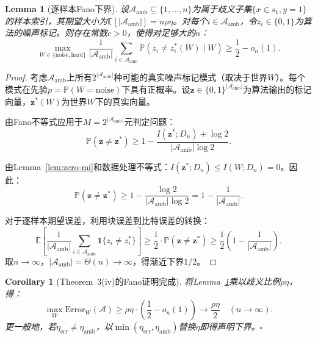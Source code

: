 \documentclass[12pt,a4paper]{ctexart}
\newtheorem{lemma}[theorem]{Lemma}
\newtheorem{corollary}[theorem]{Corollary}
\theoremstyle{definition}
\theoremstyle{remark}
\begin{document}
\begin{lemma}[逐样本Fano下界]
\label{lem:per-sample-fano}
设$\mathcal{A}_{\text{amb}} \subseteq \{1,\ldots,n\}$为属于歧义子集$\{x \in s_1, y=1\}$的样本索引，其期望大小为$\mathbb{E}[|\mathcal{A}_{\text{amb}}|] = n\rho\eta$。对每个$i \in \mathcal{A}_{\text{amb}}$，令$z_i \in \{0,1\}$为算法的噪声标记。则存在常数$c > 0$，使得对足够大的$n$：
\begin{equation}
\max_{W \in \{\text{noise}, \text{hard}\}} \frac{1}{|\mathcal{A}_{\text{amb}}|} \sum_{i \in \mathcal{A}_{\text{amb}}} \mathbb{P}(z_i \neq z_i^*(W) \mid W) \geq \frac{1}{2} - o_n(1).
\end{equation}
\end{lemma}
\begin{proof}
考虑$\mathcal{A}_{\text{amb}}$上所有$2^{|\mathcal{A}_{\text{amb}}|}$种可能的真实噪声标记模式（取决于世界$W$）。每个模式在先验$p=\mathbb{P}(W=\text{noise})$下具有正概率。设$\mathbf{z} \in \{0,1\}^{|\mathcal{A}_{\text{amb}}|}$为算法输出的标记向量，$\mathbf{z}^*(W)$为世界$W$下的真实向量。

由Fano不等式应用于$M = 2^{|\mathcal{A}_{\text{amb}}|}$元判定问题：
\begin{equation}
\mathbb{P}(\mathbf{z} \neq \mathbf{z}^*) \geq 1 - \frac{I(\mathbf{z}^*; D_n) + \log 2}{|\mathcal{A}_{\text{amb}}| \log 2}.
\end{equation}

由Lemma~\ref{lem:zero-mi}和数据处理不等式：$I(\mathbf{z}^*; D_n) \leq I(W; D_n) = 0$。因此：
\begin{equation}
\mathbb{P}(\mathbf{z} \neq \mathbf{z}^*) \geq 1 - \frac{\log 2}{|\mathcal{A}_{\text{amb}}| \log 2} = 1 - \frac{1}{|\mathcal{A}_{\text{amb}}|}.
\end{equation}

对于逐样本期望误差，利用块误差到比特误差的转换：
\begin{equation}
\mathbb{E}\left[\frac{1}{|\mathcal{A}_{\text{amb}}|} \sum_{i \in \mathcal{A}_{\text{amb}}} \mathbf{1}\{z_i \neq z_i^*\}\right] \geq \frac{1}{2} \cdot \mathbb{P}(\mathbf{z} \neq \mathbf{z}^*) \geq \frac{1}{2}\left(1 - \frac{1}{|\mathcal{A}_{\text{amb}}|}\right).
\end{equation}
取$n \to \infty$，$|\mathcal{A}_{\text{amb}}| = \Theta(n) \to \infty$，得渐近下界$1/2$。
\end{proof}

\begin{corollary}[Theorem~3(iv)的Fano证明完成]
将Lemma~\ref{lem:per-sample-fano}乘以歧义比例$\rho\eta$，得：
\begin{equation}
\max_{W} \mathrm{Error}_W(\mathcal{A}) \geq \rho\eta \cdot \left(\frac{1}{2} - o_n(1)\right) \to \frac{\rho\eta}{2} \quad (n \to \infty).
\end{equation}
更一般地，若$\eta_{\text{err}} \neq \eta_{\text{amb}}$，以$\min(\eta_{\text{err}}, \eta_{\text{amb}})$替换$\eta$即得声明下界。\hfill$\square$
\end{corollary}
\end{document}
